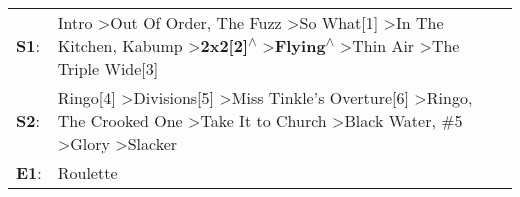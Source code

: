 \begin{supertabular}{p{0.03\textwidth}p{0.92\textwidth}}
 \textbf{S1}:  &  Intro\textsuperscript{} \textgreater \enspace Out Of Order\textsuperscript{}, \enspace The Fuzz\textsuperscript{} \textgreater \enspace So What[1]\textsuperscript{} \textgreater \enspace In The Kitchen\textsuperscript{}, \enspace Kabump\textsuperscript{} \textgreater \enspace \textbf{2x2[2]\textsuperscript{$\wedge$}} \textgreater \enspace \textbf{Flying\textsuperscript{$\wedge$}} \textgreater \enspace Thin Air\textsuperscript{} \textgreater \enspace The Triple Wide[3]\textsuperscript{}  \enspace  \\
 \textbf{S2}:  &                     Ringo[4]\textsuperscript{} \textgreater \enspace Divisions[5]\textsuperscript{} \textgreater \enspace Miss Tinkle's Overture[6]\textsuperscript{} \textgreater \enspace Ringo\textsuperscript{}, \enspace The Crooked One\textsuperscript{} \textgreater \enspace Take It to Church\textsuperscript{} \textgreater \enspace Black Water\textsuperscript{}, \enspace \#5\textsuperscript{} \textgreater \enspace Glory\textsuperscript{} \textgreater \enspace Slacker\textsuperscript{}  \enspace  \\
 \textbf{E1}:  &                                                                                                                                                                                                                                                                                                                                                                                                                                                                                  Roulette\textsuperscript{}  \enspace  \\
\end{supertabular}
